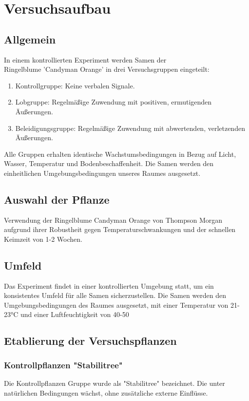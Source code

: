 \section{Versuchsaufbau}
    \subsection{Allgemein}
    In einem kontrollierten Experiment werden Samen der \\ Ringelblume 'Candyman Orange' in drei Versuchsgruppen eingeteilt:
    \begin{enumerate}
        \item Kontrollgruppe: Keine verbalen Signale.
        \item Lobgruppe: Regelmäßige Zuwendung mit positiven, ermutigenden Äußerungen.
        \item Beleidigungsgruppe: Regelmäßige Zuwendung mit abwertenden, verletzenden Äußerungen.
    \end{enumerate} 
    
    Alle Gruppen erhalten identische Wachstumsbedingungen in Bezug auf Licht, Wasser, Temperatur und Bodenbeschaffenheit. Die Samen werden den einheitlichen Umgebungsbedingungen unseres Raumes ausgesetzt. \\

    \subsection{Auswahl der Pflanze}
    Verwendung der Ringelblume Candyman Orange von Thompson Morgan aufgrund ihrer Robustheit gegen Temperaturschwankungen und der schnellen Keimzeit von 1-2 Wochen.

    \subsection{Umfeld}
    Das Experiment findet in einer kontrollierten Umgebung statt, um ein konsistentes Umfeld für alle Samen sicherzustellen. Die Samen werden den Umgebungsbedingungen des Raumes ausgesetzt, mit einer Temperatur von 21-23°C und einer Luftfeuchtigkeit von 40-50%

    \subsection{Etablierung der Versuchspflanzen}
    \subsubsection{Kontrollpflanzen "Stabilitree"}
    Die Kontrollpflanzen Gruppe wurde als "Stabilitree" bezeichnet. Die unter natürlichen Bedingungen wächst, ohne zusätzliche externe Einflüsse.
    
